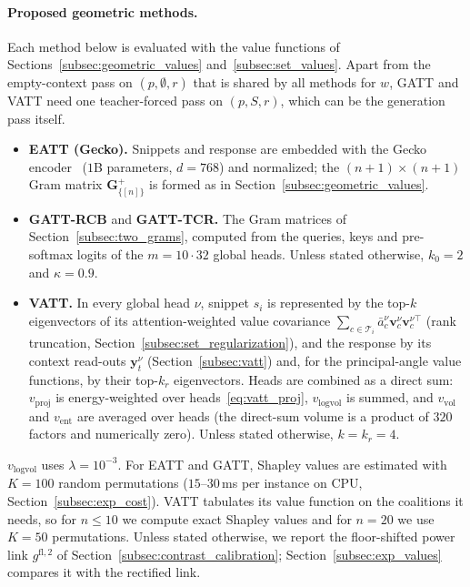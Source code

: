 \paragraph{Proposed geometric methods.}
Each method below is evaluated with the value functions of Sections~\ref{subsec:geometric_values} and~\ref{subsec:set_values}. Apart from the empty-context pass on $(p, \emptyset, r)$ that is shared by all methods for $w$, GATT and VATT need one teacher-forced pass on $(p, S, r)$, which can be the generation pass itself.
\begin{itemize}
    \item \textbf{EATT (Gecko).} Snippets and response are embedded with the Gecko encoder~\cite{lee2024gecko} ($1$B parameters, $d = 768$) and normalized; the $(n+1) \times (n+1)$ Gram matrix $\mathbf{G}^{+}_{\{[n]\}}$ is formed as in Section~\ref{subsec:geometric_values}.
    \item \textbf{GATT-RCB} and \textbf{GATT-TCR.} The Gram matrices of Section~\ref{subsec:two_grams}, computed from the queries, keys and pre-softmax logits of the $m = 10 \cdot 32$ global heads. Unless stated otherwise, $k_0 = 2$ and $\kappa = 0.9$.
    \item \textbf{VATT.} In every global head $\nu$, snippet $s_i$ is represented by the top-$k$ eigenvectors of its attention-weighted value covariance $\sum_{c \in \mathcal{T}_i} \bar{a}^\nu_c \mathbf{v}^\nu_c \mathbf{v}^{\nu\top}_c$ (rank truncation, Section~\ref{subsec:set_regularization}), and the response by its context read-outs $\mathbf{y}^\nu_t$ (Section~\ref{subsec:vatt}) and, for the principal-angle value functions, by their top-$k_r$ eigenvectors. Heads are combined as a direct sum: $v_{\text{proj}}$ is energy-weighted over heads~\eqref{eq:vatt_proj}, $v_{\text{logvol}}$ is summed, and $v_{\text{vol}}$ and $v_{\text{ent}}$ are averaged over heads (the direct-sum volume is a product of $320$ factors and numerically zero). Unless stated otherwise, $k = k_r = 4$.
\end{itemize}
$v_{\text{logvol}}$ uses $\lambda = 10^{-3}$. For EATT and GATT, Shapley values are estimated with $K = 100$ random permutations ($15$--$30$\,ms per instance on CPU, Section~\ref{subsec:exp_cost}). VATT tabulates its value function on the coalitions it needs, so for $n \le 10$ we compute exact Shapley values and for $n = 20$ we use $K = 50$ permutations. Unless stated otherwise, we report the floor-shifted power link $g^{\text{fl},2}$ of Section~\ref{subsec:contrast_calibration}; Section~\ref{subsec:exp_values} compares it with the rectified link.

